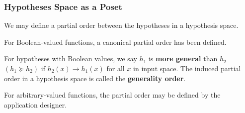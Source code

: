 \documentclass{beamer}
\begin{document}
\begin{frame}
\frametitle{Hypotheses Space as a Poset}
We may define a partial order between the hypotheses in a hypothesis space.

For Boolean-valued functions, a canonical partial order has been defined.

\begin{definition}
	For hypotheses with Boolean values, we say $h_1$ is \textbf{more general} than $h_2$ $(h_1 \succeq h_2)$ if $h_2(x) \rightarrow h_1(x)$ for all $x$ in input space. The induced partial order in a hypothesis space is called the \textbf{generality order}.
\end{definition}

For arbitrary-valued functions, the partial order may be defined by the application designer.

\end{frame}
\end{document}
